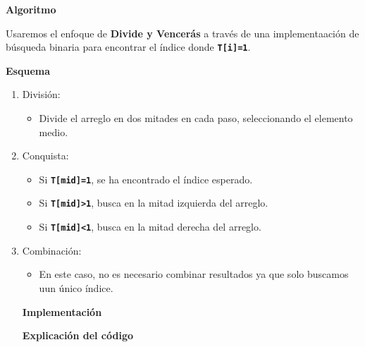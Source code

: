 \begin{enumerate}[label=\color{red}\textbf{\arabic*)}]
  \textbf{Algoritmo} 

  Usaremos el enfoque de \textbf{Divide y Vencerás} a través de una implementaación de búsqueda binaria para encontrar el índice donde \textbf{\texttt{T[i]=1}}.

  \textbf{Esquema} 
  \begin{enumerate}[label=\arabic*)]
    \item División:
      \begin{itemize}[label=\textbullet]
        \item Divide el arreglo en dos mitades en cada paso, seleccionando el elemento medio.
      \end{itemize}
    \item Conquista:
      \begin{itemize}[label=\textbullet]
        \item Si \textbf{\texttt{T[mid]=1}}, se ha encontrado el índice esperado. 
        \item Si \textbf{\texttt{T[mid]>1}}, busca en la mitad izquierda del arreglo. 
        \item Si \textbf{\texttt{T[mid]<1}}, busca en la mitad derecha del arreglo. 
      \end{itemize}
    \item Combinación:
      \begin{itemize}[label=\textbullet]
        \item En este caso, no es necesario combinar resultados ya que solo buscamos uun único índice.
      \end{itemize}
      \textbf{Implementación}

      

      \textbf{Explicación del código}


\end{enumerate}
\end{enumerate}
